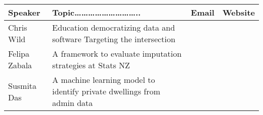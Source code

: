 \documentclass[
]{book}
\begin{document}
\begin{longtable}[]{@{}llll@{}}
\toprule
\begin{minipage}[b]{0.22\columnwidth}\raggedright
Speaker\strut
\end{minipage} & \begin{minipage}[b]{0.22\columnwidth}\raggedright
Topic{\ldots{}\ldots{}\ldots{}\ldots{}\ldots{}\ldots{}\ldots{}\ldots{}\ldots{}..}\strut
\end{minipage} & \begin{minipage}[b]{0.22\columnwidth}\raggedright
Email\strut
\end{minipage} & \begin{minipage}[b]{0.22\columnwidth}\raggedright
Website\strut
\end{minipage}\tabularnewline
\midrule
\endhead
\begin{minipage}[t]{0.22\columnwidth}\raggedright
Chris Wild\strut
\end{minipage} & \begin{minipage}[t]{0.22\columnwidth}\raggedright
Education democratizing data and software Targeting the intersection\strut
\end{minipage} & \begin{minipage}[t]{0.22\columnwidth}\raggedright
\strut
\end{minipage} & \begin{minipage}[t]{0.22\columnwidth}\raggedright
\strut
\end{minipage}\tabularnewline
\begin{minipage}[t]{0.22\columnwidth}\raggedright
Felipa Zabala\strut
\end{minipage} & \begin{minipage}[t]{0.22\columnwidth}\raggedright
A framework to evaluate imputation strategies at Stats NZ\strut
\end{minipage} & \begin{minipage}[t]{0.22\columnwidth}\raggedright
\strut
\end{minipage} & \begin{minipage}[t]{0.22\columnwidth}\raggedright
\strut
\end{minipage}\tabularnewline
\begin{minipage}[t]{0.22\columnwidth}\raggedright
Susmita Das\strut
\end{minipage} & \begin{minipage}[t]{0.22\columnwidth}\raggedright
A machine learning model to identify private dwellings from admin data\strut
\end{minipage} & \begin{minipage}[t]{0.22\columnwidth}\raggedright

\end{minipage}
\end{longtable}
\end{document}
